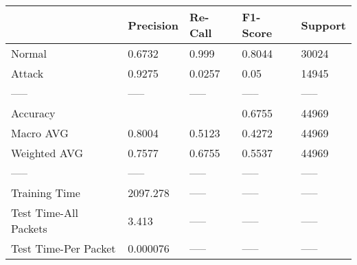 \begin{tabular}{lllll}
\toprule
{} & Precision & Re-Call & F1-Score & Support \\
\midrule
Normal                &    0.6732 &   0.999 &   0.8044 &   30024 \\
Attack                &    0.9275 &  0.0257 &     0.05 &   14945 \\
-----                 &     ----- &   ----- &    ----- &   ----- \\
Accuracy              &           &         &   0.6755 &   44969 \\
Macro AVG             &    0.8004 &  0.5123 &   0.4272 &   44969 \\
Weighted AVG          &    0.7577 &  0.6755 &   0.5537 &   44969 \\
-----                 &     ----- &   ----- &    ----- &   ----- \\
Training Time         &  2097.278 &   ----- &    ----- &   ----- \\
Test Time-All Packets &     3.413 &   ----- &    ----- &   ----- \\
Test Time-Per Packet  &  0.000076 &   ----- &    ----- &   ----- \\
\bottomrule
\end{tabular}
